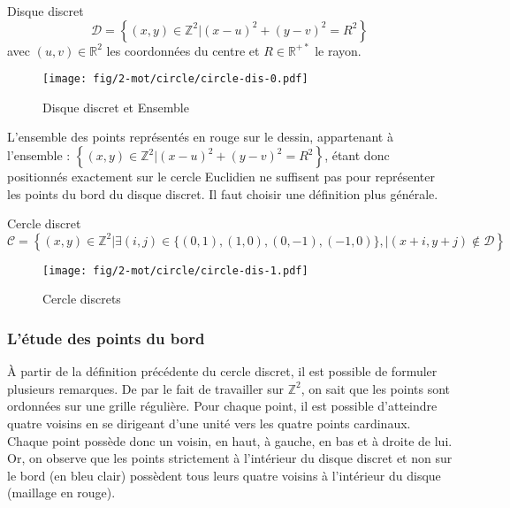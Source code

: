 \begin{Definition}{Disque discret}
\label{def:disk-dis}
  $$\mathcal{D} =  \left\{ (x,y) \in \mathbb{Z}^{2} |  (x - u)^2 + (y - v)^2 = R^2 \right\}$$
  avec $(u,v) \in \mathbb{R}^{2}$ les coordonnées du centre et $R \in \mathbb{R}^{+*}$ le rayon.\\
\end{Definition}



\begin{figure}[H]
  \centering
  \texttt{[image: fig/2-mot/circle/circle-dis-0.pdf]}
  \caption{Disque discret et Ensemble }
\end{figure}

L'ensemble des points représentés en rouge sur le dessin, appartenant à l'ensemble : $\left\{ (x,y) \in \mathbb{Z}^{2} |  (x - u)^2 + (y - v)^2 = R^2 \right\}$, étant donc positionnés exactement sur le cercle Euclidien ne suffisent pas pour représenter les points du bord du disque discret. Il faut choisir une définition plus générale.

\begin{Definition}{Cercle discret}
\label{def:cer-dis}
  $$ \mathcal{C} =  \left\{ (x,y) \in \mathbb{Z}^{2} | \exists (i,j) \in \{ (0,1), (1,0), (0,-1), (-1,0)\}, | (x+i,y+j) \notin \mathcal{D} \right\}$$
\end{Definition}


\begin{figure}[H]
  \centering
  \texttt{[image: fig/2-mot/circle/circle-dis-1.pdf]}
  \caption{Cercle discrets}
\end{figure}

\subsubsection{L'étude des points du bord}

À partir de la définition précédente du cercle discret, il est possible de formuler plusieurs remarques. De par le fait de travailler sur $\mathbb{Z}^{2}$, on sait que les points sont ordonnées sur une grille régulière. Pour chaque point, il est possible d'atteindre quatre voisins en se dirigeant d'une unité vers les quatre points cardinaux. Chaque point possède donc un voisin, en haut, à gauche, en bas et à droite de lui. Or, on observe que les points strictement à l'intérieur du disque discret et non sur le bord (en bleu clair) possèdent tous leurs quatre voisins à l'intérieur du disque (maillage en rouge). 

